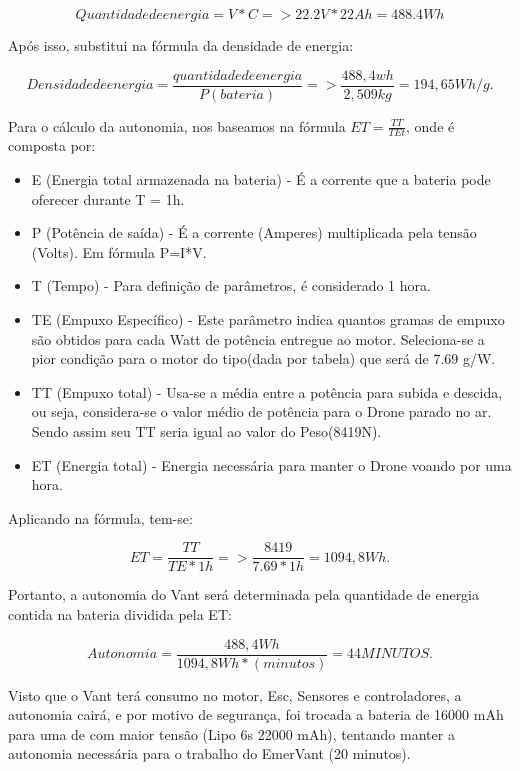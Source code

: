 \begin{equation}
Quantidade de energia = V*C => 22.2V * 22Ah = 488.4Wh
\end{equation}

Após isso, substitui na fórmula da densidade de energia: 

\begin{equation}
Densidade de energia = \frac{quantidade de energia}{P(bateria)} => \frac{488,4wh}{2,509kg} = 194,65 Wh/g.
\end{equation}

Para o cálculo da autonomia, nos baseamos na fórmula $ET=\frac{TT}{TEt}$, onde é composta por:

\begin{itemize}
\item E (Energia total armazenada na bateria) - É a corrente que a bateria pode oferecer durante T = 1h.
\item P (Potência de saída) - É a corrente (Amperes) multiplicada pela tensão (Volts). Em fórmula P=I*V.
\item T (Tempo) - Para definição de parâmetros, é considerado 1 hora.
\item TE (Empuxo Específico) - Este parâmetro indica quantos gramas de empuxo são obtidos para cada Watt de potência entregue ao motor. Seleciona-se a pior condição para o motor do tipo(dada por tabela) que será de 7.69 g/W.
\item TT (Empuxo total) - Usa-se a média entre a potência para subida e descida, ou seja, considera-se o valor médio de potência para o Drone parado no ar. Sendo assim seu TT seria igual ao valor do Peso(8419N).  
\item ET (Energia total) - Energia necessária para manter o Drone voando por uma hora. 
\end{itemize}

Aplicando na fórmula, tem-se:

\begin{equation}
ET=\frac{TT}{TE*1h} => \frac{8419}{7.69*1h} = 1094,8 Wh.
\end{equation}

Portanto, a autonomia do Vant será determinada pela quantidade de energia contida na bateria dividida pela ET:

\begin{equation}
Autonomia = \frac{488,4Wh}{1094,8Wh *(minutos)} = 44 MINUTOS.
\end{equation}

Visto que o Vant terá consumo no motor, Esc, Sensores e controladores, a autonomia cairá, e por motivo de segurança, foi trocada a bateria de 16000 mAh para uma de com maior  tensão (Lipo 6s 22000 mAh), tentando manter a autonomia necessária para o trabalho do EmerVant (20 minutos). 

